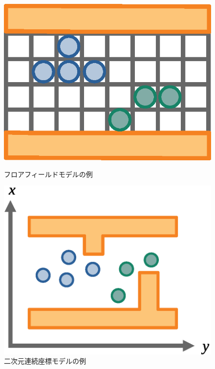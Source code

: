 \begin{figure}[htbp]
  \begin{minipage}[b]{0.5\linewidth}
    \centering
    \includegraphics[keepaspectratio, scale=0.37]{figure/seruotomaton_image4.eps}
    \caption{フロアフィールドモデルの例}
    \label{fig:serumaton}
  \end{minipage}
  \begin{minipage}[b]{0.5\linewidth}
    \centering
    \includegraphics[keepaspectratio, scale=0.37]{figure/renzoku_image2.eps}
    \caption{二次元連続座標モデルの例}
    \label{fig:renzoku}
  \end{minipage}
\end{figure}



